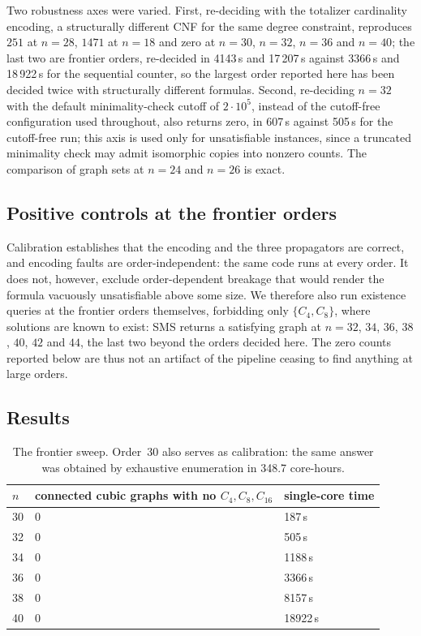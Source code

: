\documentclass[11pt]{article}
\begin{document}
Two robustness axes were varied. First, re-deciding with the totalizer
cardinality encoding, a structurally different CNF for the same degree
constraint, reproduces $251$ at $n=28$, $1471$ at $n=18$ and zero at $n=30$,
$n=32$, $n=36$ and $n=40$; the last two are frontier orders, re-decided in
4143\,s and 17\,207\,s against 3366\,s and 18\,922\,s for the sequential
counter, so the largest order reported here has been decided twice with
structurally different formulas. Second, re-deciding $n=32$ with the default
minimality-check cutoff of $2\cdot10^5$, instead of the cutoff-free
configuration used throughout, also returns zero, in 607\,s against 505\,s for
the cutoff-free run; this axis is used only for unsatisfiable instances, since
a truncated minimality check may admit isomorphic copies into nonzero counts.
The comparison of graph sets at $n=24$ and $n=26$ is exact.

\subsection{Positive controls at the frontier orders}

Calibration establishes that the encoding and the three propagators are
correct, and encoding faults are order-independent: the same code runs at every
order. It does not, however, exclude order-dependent breakage that would render
the formula vacuously unsatisfiable above some size. We therefore also run
existence queries at the frontier orders themselves, forbidding only
$\{C_4,C_8\}$, where solutions are known to exist: SMS returns a satisfying
graph at $n=32$, $34$, $36$, $38$, $40$, $42$ and $44$, the last two beyond the
orders decided here. The zero counts reported below are
thus not an artifact of the pipeline ceasing to find anything at large orders.

\subsection{Results}

\begin{table}[h]\centering
\begin{tabular}{lll}
\toprule
$n$ & connected cubic graphs with no $C_4,C_8,C_{16}$ & single-core time \\
\midrule
30 & 0 & 187\,s \\
32 & 0 & 505\,s \\
34 & 0 & 1188\,s \\
36 & 0 & 3366\,s \\
38 & 0 & 8157\,s \\
40 & 0 & 18922\,s \\
\bottomrule
\end{tabular}
\caption{The frontier sweep. Order~30 also serves as calibration: the same
answer was obtained by exhaustive enumeration in 348.7 core-hours.}
\label{tab:frontier}
\end{table}
\end{document}
